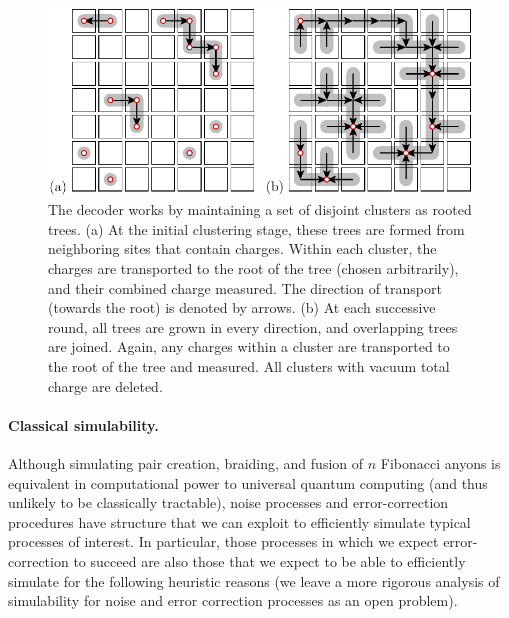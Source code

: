 \documentclass[aps, prl, letterpaper, twocolumn, superscriptaddress, notitlepage, 10pt]{revtex4}
\begin{document}
\begin{figure}[t!]
\begin{center}
	\includegraphics[width=1.0\columnwidth]{pic-decode.pdf}
\caption{The decoder works by maintaining a set of disjoint clusters as rooted trees.
(a) At the initial clustering stage, these trees are formed 
from neighboring sites that contain charges. Within each cluster, the 
charges are transported to the root of the tree (chosen 
arbitrarily), and their combined charge measured. The direction of transport 
(towards the root) is denoted by arrows.
(b) At each successive round, all trees are grown in 
every direction, and overlapping trees are joined. Again, any charges 
within a cluster are transported to the root of the 
tree and measured. All clusters with vacuum total charge are deleted.
\label{f:decode}
}
\end{center}
\vspace{-10pt}
\end{figure}

\paragraph{Classical simulability.}

Although simulating pair creation, braiding, and fusion of $n$ Fibonacci anyons is equivalent 
in computational power to universal quantum computing (and thus unlikely to be classically 
tractable), noise processes and error-correction procedures have structure that we can 
exploit to efficiently simulate typical processes of interest. In particular, those 
processes in which we expect error-correction to succeed are also those that we expect to 
be able to efficiently simulate for the following heuristic reasons 
(we leave a more rigorous analysis of simulability for noise 
and error correction processes as an open problem).
\end{document}

